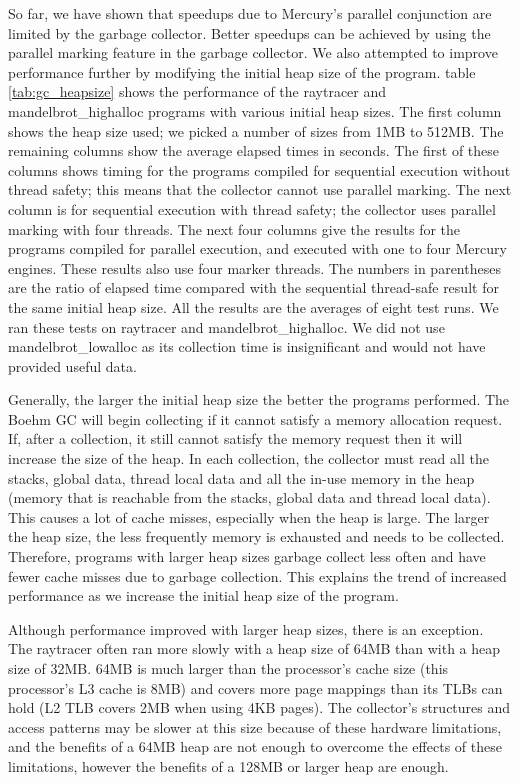 So far,
we have shown that speedups due to Mercury's parallel conjunction
are limited by the garbage collector.
Better speedups can be achieved by using the parallel marking feature in the
garbage collector.
We also attempted to improve performance further by modifying the initial
heap size of the program.
table \ref{tab:gc_heapsize} shows the performance of the raytracer and
mandelbrot\_highalloc programs with various initial heap sizes.
The first column shows the heap size used;
we picked a number of sizes from 1MB to 512MB.
The remaining columns show the average elapsed times in seconds.
The first of these columns shows timing for the programs compiled for
sequential execution without thread safety;
this means that the collector cannot use parallel marking.
The next column is for sequential execution with thread safety;
the collector uses parallel marking with four threads.
The next four columns give the results for the programs compiled for
parallel execution, and executed with one to four Mercury engines.
These results also use four marker threads.
The numbers in parentheses are the ratio of elapsed time compared with the
sequential thread-safe result for the same initial heap size.
All the results are the averages of eight test runs.
We ran these tests on raytracer and mandelbrot\_highalloc.
We did not use mandelbrot\_lowalloc as its collection time is insignificant
and would not have provided useful data.

Generally, the larger the initial heap size the better the programs
performed.
The Boehm GC will begin collecting if it cannot satisfy a memory allocation
request.
If, after a collection, it still cannot satisfy the memory request then it
will increase the size of the heap.
In each collection,
the collector must read all the stacks, global data, thread local data and
all the in-use memory in the heap 
(memory that is reachable from the stacks, global data and thread local
data).
This causes a lot of cache misses, especially when the heap is large.
The larger the heap size,
the less frequently memory is exhausted and needs to be collected.
Therefore,
programs with larger heap sizes garbage collect less often and
have fewer cache misses due to garbage collection.
This explains the trend of increased performance as we increase the initial
heap size of the program.

Although performance improved with larger heap sizes,
there is an exception.
The raytracer often ran more slowly with a heap size of 64MB
than with a heap size of 32MB.
64MB is much larger than the processor's cache size
(this processor's L3 cache is 8MB) and
covers more page mappings than its TLBs can hold (L2 TLB covers 2MB when
using 4KB pages).
The collector's structures and access patterns may be slower at this size
because of these hardware limitations,
and the benefits of a 64MB heap are not enough to overcome the effects of
these limitations,
however the benefits of a 128MB or larger heap are enough.

